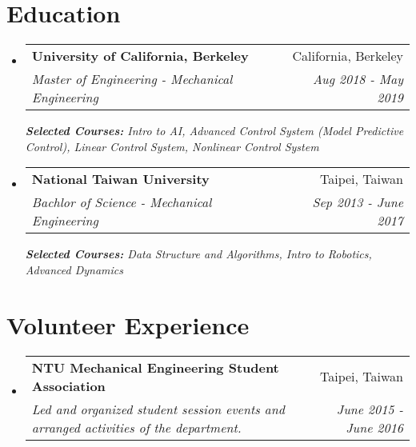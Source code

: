 \documentclass[a4paper,20pt]{article}
\makeatletter
\newcommand{\resumeSubheading}[4]{
  \vspace{-1pt}\item
    \begin{tabular*}{0.97\textwidth}{l@{\extracolsep{\fill}}r}
      \textbf{#1} & #2 \\
      \textit{#3} & \textit{#4} \\
    \end{tabular*}\vspace{-5pt}
}
\newcommand{\resumeSubHeadingListStart}{\begin{itemize}[leftmargin=*]}
\newcommand{\resumeSubHeadingListEnd}{\end{itemize}}
\makeatother
\begin{document}
\section{Education}
\resumeSubHeadingListStart
\resumeSubheading
{University of California, Berkeley}{California, Berkeley}
{Master of Engineering - Mechanical Engineering}{Aug 2018 - May 2019}
{\scriptsize \textit{ \footnotesize{\newline{}\textbf{Selected Courses:} Intro to AI, Advanced Control System (Model Predictive Control), Linear Control System, Nonlinear Control System}}}
\resumeSubheading
{National Taiwan University}{Taipei, Taiwan}
{Bachlor of Science - Mechanical Engineering}{Sep 2013 - June 2017}
{\scriptsize \textit{ \footnotesize{\newline{}\textbf{Selected Courses:} Data Structure and Algorithms, Intro to Robotics, Advanced Dynamics}}}
\resumeSubHeadingListEnd

\section{Volunteer Experience}
  \resumeSubHeadingListStart
	\resumeSubheading
    {NTU Mechanical Engineering Student Association}{Taipei, Taiwan}
    {Led and organized student session events and arranged activities of the department.}{June 2015 - June 2016}
\vspace{5pt}
\resumeSubHeadingListEnd
\end{document}
